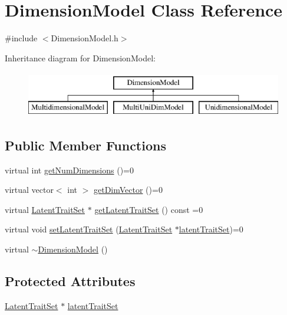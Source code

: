 \hypertarget{classDimensionModel}{}\section{Dimension\+Model Class Reference}
\label{classDimensionModel}


{\ttfamily \#include $<$Dimension\+Model.\+h$>$}

Inheritance diagram for Dimension\+Model\+:\begin{figure}[H]
\begin{center}
\leavevmode
\includegraphics[height=2.000000cm]{classDimensionModel}
\end{center}
\end{figure}
\subsection*{Public Member Functions}
\begin{DoxyCompactItemize}
\item 
virtual int \hyperlink{classDimensionModel_aaf16c9215f4a7d08d67bd844adfcc62a}{get\+Num\+Dimensions} ()=0
\item 
virtual vector$<$ int $>$ \hyperlink{classDimensionModel_a0aab2664f71949ac52d654730840056b}{get\+Dim\+Vector} ()=0
\item 
virtual \hyperlink{classLatentTraitSet}{Latent\+Trait\+Set} $\ast$ \hyperlink{classDimensionModel_a37d2d9ab998a4e65628571e6144311f6}{get\+Latent\+Trait\+Set} () const =0
\item 
virtual void \hyperlink{classDimensionModel_aed42259f6cd663cbd1df07d18d4b1e07}{set\+Latent\+Trait\+Set} (\hyperlink{classLatentTraitSet}{Latent\+Trait\+Set} $\ast$\hyperlink{classDimensionModel_af202cd5a44ee99d865674c6e26d770c8}{latent\+Trait\+Set})=0
\item 
virtual \hyperlink{classDimensionModel_aa7bb6d6c4ef9cab805d02a66778be361}{$\sim$\+Dimension\+Model} ()
\end{DoxyCompactItemize}
\subsection*{Protected Attributes}
\begin{DoxyCompactItemize}
\item 
\hyperlink{classLatentTraitSet}{Latent\+Trait\+Set} $\ast$ \hyperlink{classDimensionModel_af202cd5a44ee99d865674c6e26d770c8}{latent\+Trait\+Set}
\end{DoxyCompactItemize}


